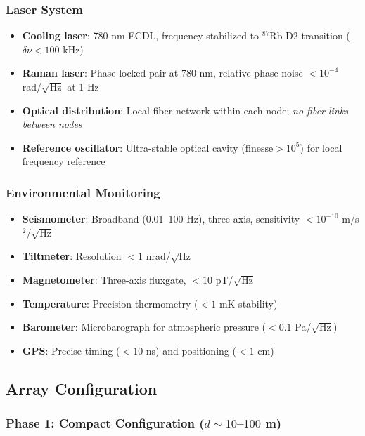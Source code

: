\documentclass[12pt,a4paper]{article}
\theoremstyle{remark}
\begin{document}
\subsubsection{Laser System}

\begin{itemize}
\item \textbf{Cooling laser}: 780 nm ECDL, frequency-stabilized to $^{87}$Rb
D2 transition ($\delta\nu < 100$ kHz)
\item \textbf{Raman laser}: Phase-locked pair at 780 nm, relative phase noise
$< 10^{-4}$ rad/$\sqrt{\text{Hz}}$ at 1 Hz
\item \textbf{Optical distribution}: Local fiber network within each node;
\emph{no fiber links between nodes}
\item \textbf{Reference oscillator}: Ultra-stable optical cavity
($\text{finesse} > 10^5$) for local frequency reference
\end{itemize}

\subsubsection{Environmental Monitoring}

\begin{itemize}
\item \textbf{Seismometer}: Broadband (0.01--100 Hz), three-axis,
sensitivity $< 10^{-10}$ m/s$^2$/$\sqrt{\text{Hz}}$
\item \textbf{Tiltmeter}: Resolution $< 1$ nrad/$\sqrt{\text{Hz}}$
\item \textbf{Magnetometer}: Three-axis fluxgate, $< 10$ pT/$\sqrt{\text{Hz}}$
\item \textbf{Temperature}: Precision thermometry ($< 1$ mK stability)
\item \textbf{Barometer}: Microbarograph for atmospheric pressure
($< 0.1$ Pa/$\sqrt{\text{Hz}}$)
\item \textbf{GPS}: Precise timing ($< 10$ ns) and positioning ($< 1$ cm)
\end{itemize}

\subsection{Array Configuration}\label{sec:array-config}

\subsubsection{Phase 1: Compact Configuration ($d \sim 10$--$100$ m)}
\end{document}
